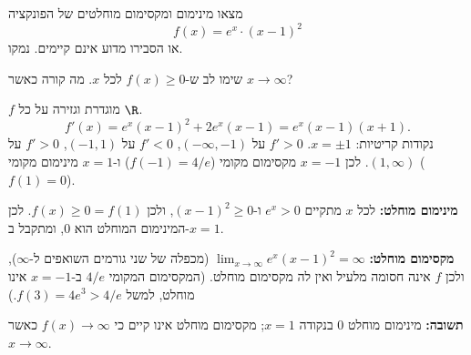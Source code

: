 
\begin{question}
מצאו מינימום ומקסימום מוחלטים של הפונקציה
\[ f(x) = e^x \cdot (x-1)^2 \]
או הסבירו מדוע אינם קיימים. נמקו.
\end{question}

\begin{hint}
שימו לב ש-$f(x) \ge 0$ לכל $x$. מה קורה כאשר $x \to \infty$?
\end{hint}

\begin{solution}
$f$ מוגדרת וגזירה על כל $\R$.
\[ f'(x) = e^x(x-1)^2 + 2e^x(x-1) = e^x(x-1)(x+1). \]
נקודות קריטיות: $x = \pm 1$. $f' > 0$ על $(-\infty,-1)$, $f'<0$ על $(-1,1)$, $f'>0$ על $(1,\infty)$.
לכן $x=-1$ מקסימום מקומי ($f(-1) = 4/e$) ו-$x=1$ מינימום מקומי ($f(1)=0$).

\textbf{מינימום מוחלט:} לכל $x$ מתקיים $e^x>0$ ו-$(x-1)^2 \ge 0$, ולכן $f(x) \ge 0 = f(1)$. לכן המינימום המוחלט הוא $0$, ומתקבל ב-$x=1$.

\textbf{מקסימום מוחלט:} $\lim_{x\to\infty} e^x(x-1)^2 = \infty$ (מכפלה של שני גורמים השואפים ל-$\infty$), ולכן $f$ אינה חסומה מלעיל ואין לה מקסימום מוחלט.
(המקסימום המקומי $4/e$ ב-$x=-1$ אינו מוחלט, למשל $f(3) = 4e^3 > 4/e$.)

\textbf{תשובה:} מינימום מוחלט $0$ בנקודה $x=1$; מקסימום מוחלט אינו קיים כי $f(x)\to\infty$ כאשר $x\to\infty$.
\end{solution}

